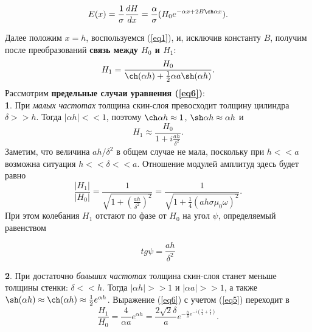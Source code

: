 \documentclass[a4paper,12pt]{article}
\theoremstyle{plain} %
\theoremstyle{definition} %
\theoremstyle{remark} %
\begin{document}
	\begin{equation*}
		E(x) = \frac{1}{\sigma} \frac{dH}{dx} = \frac{\alpha}{\sigma} (H_0 e^{-\alpha x + 2B \ch \alpha x}).
	\end{equation*}
	
	\indent Далее положим $x = h$, воспользуемся (\ref{eq1}), и, исключив константу $B$, получим после преобразований \textbf{связь между $H_0$ и $H_1$}:\\
	\begin{equation}\label{eq6}
		H_1 = \frac{H_0}{\ch (\alpha h) + \frac{1}{2} \alpha a \sh(\alpha h)}.
	\end{equation}
	\indent Рассмотрим \textbf{предельные случаи уравнения (\ref{eq6})}: \\
	\indent \textbf{1}. При \textit{малых частотах} толщина скин-слоя превосходит толщину цилиндра $\delta >> h$. Тогда $|\alpha h| << 1$, поэтому $\ch \alpha h \approx 1$, $\sh \alpha h \approx \alpha h$ и 
	\begin{equation}\label{eq7}
		H_1 \approx \frac{H_0}{1 + i \frac{ah}{\delta^2}}.
	\end{equation}
	\indent Заметим, что величина $ah/\delta^2$ в общем случае не мала, поскольку при $h << a$ возможна ситуация $h << \delta << a$. Отношение модулей амплитуд здесь будет равно
	\begin{equation}\label{eq8}
		\frac{|H_1|}{|H_0|} = \frac{1}{\sqrt{1 + (\frac{ah}{\delta^2})^2}} = \frac{1}{\sqrt{1 + \frac{1}{4}(ah \sigma \mu_0 \omega)^2}}.
	\end{equation}
	\indent При этом колебания $H_1$ отстают по фазе от $H_0$ на угол $\psi$, определяемый равенством 
	
	\begin{equation}\label{eqq}
		tg \psi = \frac{ah}{\delta^2}
	\end{equation}
	
	\indent \textbf{2}. При достаточно \textit{больших частотах} толщина скин-слоя станет меньше толщины стенки: $\delta << h$. Тогда $|\alpha h| >> 1$ и $|\alpha a| >> 1$, а также $\sh(\alpha h) \approx \ch(\alpha h) \approx \frac{1}{2} e^{\alpha h}$. Выражение (\ref{eq6}) с учетом (\ref{eq5}) переходит в 
	\begin{equation}\label{eq9}
		\frac{H_1}{H_0} = \frac{4}{\alpha a} e^{\alpha h} = \frac{2\sqrt{2} \delta}{a} e^{-\frac{h}{\delta} e^{-i (\frac{\pi}{4} + \frac{h}{\delta})}}.
	\end{equation}
	
\end{document}
